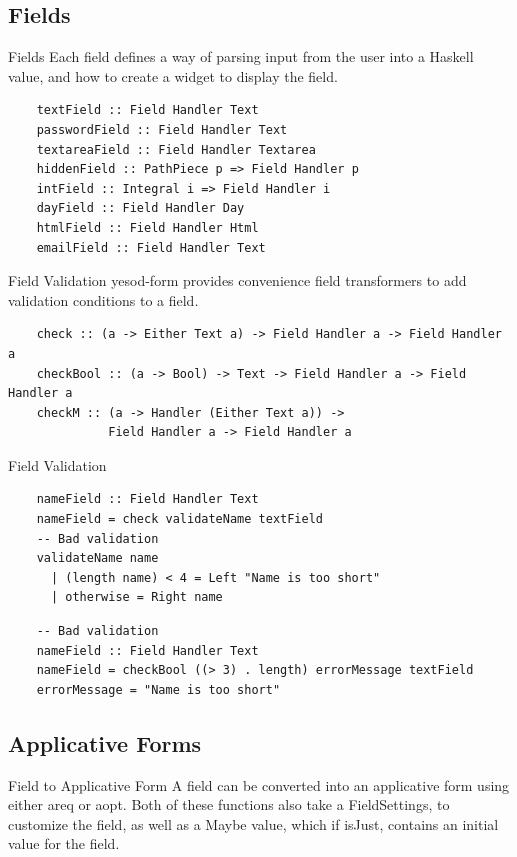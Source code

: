 \documentclass[pdf]{beamer}
\begin{document}
\subsection{Fields}
\begin{frame}[fragile]{Fields}
  Each field defines a way of parsing input from the user into a
  Haskell value, and how to create a widget to display the field.
  \begin{verbatim}
    textField :: Field Handler Text
    passwordField :: Field Handler Text
    textareaField :: Field Handler Textarea
    hiddenField :: PathPiece p => Field Handler p
    intField :: Integral i => Field Handler i
    dayField :: Field Handler Day
    htmlField :: Field Handler Html
    emailField :: Field Handler Text
  \end{verbatim}
\end{frame}

\begin{frame}[fragile]{Field Validation}
  yesod-form provides convenience field transformers to add validation
  conditions to a field.\\
  \begin{verbatim}
    check :: (a -> Either Text a) -> Field Handler a -> Field Handler a
    checkBool :: (a -> Bool) -> Text -> Field Handler a -> Field Handler a
    checkM :: (a -> Handler (Either Text a)) ->
              Field Handler a -> Field Handler a
  \end{verbatim}
\end{frame}

\begin{frame}[fragile]{Field Validation}
  \begin{verbatim}
    nameField :: Field Handler Text
    nameField = check validateName textField
    -- Bad validation
    validateName name
      | (length name) < 4 = Left "Name is too short"
      | otherwise = Right name
  \end{verbatim}
  \pause
  \begin{verbatim}
    -- Bad validation
    nameField :: Field Handler Text
    nameField = checkBool ((> 3) . length) errorMessage textField
    errorMessage = "Name is too short"
  \end{verbatim}
\end{frame}

\subsection{Applicative Forms}
\begin{frame}{Field to Applicative Form}
  A field can be converted into an applicative form using either areq
  or aopt. Both of these functions also take a FieldSettings, to
  customize the field, as well as a Maybe value, which if isJust,
  contains an initial value for the field.
\end{frame}
\end{document}
